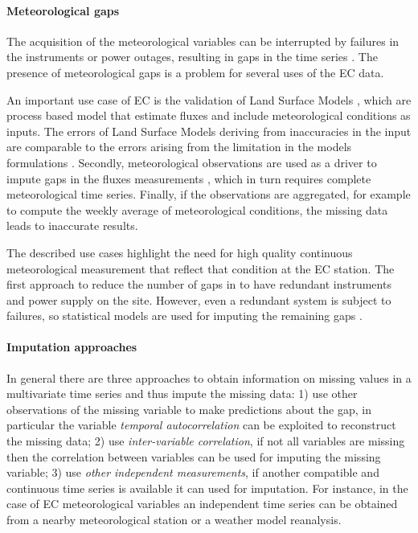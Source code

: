 \documentclass{article}
\begin{document}
\paragraph{Meteorological gaps} The acquisition of the meteorological variables can be interrupted by failures in the instruments or power outages, resulting in gaps in the time series \cite{aubinet_eddy_2012-1}.
The presence of meteorological gaps is a problem for several uses of the EC data.

An important use case of EC is the validation of Land Surface Models \cite{balzarolo_evaluating_2014, friend_fluxnet_2007-1, bonan_improving_2011-1, kramer_evaluation_2002}, which are process based model that estimate fluxes and include meteorological conditions as inputs. The errors of Land Surface Models deriving from inaccuracies in the input are comparable to the errors arising from the limitation in the models formulations \cite{zhao_how_2012}. 
Secondly, meteorological observations are used as a driver to impute gaps in the fluxes measurements \cite{aubinet_eddy_2012-1}, which in turn requires complete meteorological time series.
Finally, if the observations are aggregated, for example to compute the weekly average of meteorological conditions, the missing data leads to inaccurate results. 

The described use cases highlight the need for high quality continuous meteorological measurement that reflect that condition at the EC station. The first approach to reduce the number of gaps in to have redundant instruments and power supply on the site. However, even a redundant system is subject to failures, so statistical models are used for imputing the remaining gaps \cite{aubinet_eddy_2012-1}.

\paragraph{Imputation approaches} In general there are three approaches to obtain information on missing values in a multivariate time series and thus impute the missing data: 1) use other observations of the missing variable to make predictions about the gap, in particular the variable \emph{temporal autocorrelation} can be exploited to reconstruct the missing data; 2) use \emph{inter-variable correlation}, if not all variables are missing then the correlation between variables can be used for imputing the missing variable; 3) use \emph{other independent measurements}, if another compatible and continuous time series is available it can used for imputation. For instance, in the case of EC meteorological variables an independent time series can be obtained from a nearby meteorological station or a weather model reanalysis. 
\end{document}
